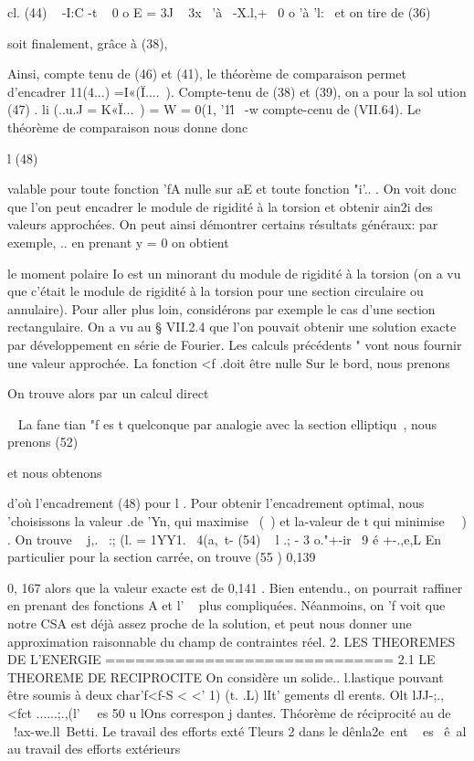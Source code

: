 {{{cl.
(44) ~ 
-I:C -t ~ 0 o
E = 
3J 
~ 3x~ 
'à~ 
-X.l,+~ 0 o 'à 'l:~ 
et on tire de (36) 

soit finalement, grâce à (38), 

Ainsi, compte tenu de (46) et (41), le théorème de comparaison permet d'encadrer 11(4...) =I«(Ï....~). Compte-tenu de (38) et (39), on a pour la sol ution 
(47) . li (..u.J = K«Ï...~) = W = 0(1, '1l\.~ -w 
compte-cenu de (VII.64). Le théorème de comparaison nous donne donc 


l 
(48) 


valable pour toute fonction 'fA nulle sur aE et toute fonction "i'.. . On voit 
donc que l'on peut encadrer le module de rigidité à la torsion et obtenir ain2i des valeurs approchées. 
On peut ainsi démontrer certains résultats généraux: par exemple,
.. 
en prenant y = 0 on obtient 

le moment polaire Io est un minorant du module de rigidité à la torsion (on a vu que c'était le module de rigidité à la torsion pour une section circulaire ou annulaire). 
Pour aller plus loin, considérons par exemple le cas d'une sec­tion rectangulaire. On a vu au § VII.2.4 que l'on pouvait obtenir une so­lution exacte par développement en série de Fourier. Les calculs précédents 
"
vont nous fournir une valeur approchée. La fonction <f .doit être nulle Sur le bord, nous prenons 

On trouve alors par un calcul direct 

~ 
La fane tian "f es t quelconque par analogie avec la section elliptiqu~, nous prenons 
(52) 

et nous obtenons 

d'où l'encadrement (48) pour l . Pour obtenir l'encadrement optimal, nous 'choisissons la valeur .de 'Yn, qui maximise ~(~) et la-valeur de t qui mi­nimise ~~) . On trouve 
~ j,.~
:; (l. 
=
1YY1.~ 
4(a,~t-%
(54) ~ l .;
-
3 o."+-ir~ 9 é +-.,e,L 
En particulier pour la section carrée, on trouve 
(55 ) 0,139 

0, 167 
alors que la valeur exacte est de 0,141 . Bien entendu., on pourrait raffi­ner en prenant des fonctions A et l' ~ plus compliquées. Néanmoins, on
'f 
voit que notre CSA est déjà assez proche de la solution, et peut nous donner une approximation raisonnable du champ de contraintes réel. 
2. LES THEOREMES DE L'ENERGIE 
============================= 
2.1 LE THEOREME DE RECIPROCITE 
On considère un solide.. l.lastique pouvant être soumis à deux char­'f<f-S < <' 1) (t. .L) lIt'
gements dl erents. Olt lJJ-;.,<fct ......;.,(l'~~ es 50 u lOns correspon
j
dantes. 
Théorème de réciprocité au de ~!ax-we.ll~Betti. Le travail des efforts exté­
Tleurs 2 dans le dênla2e~ent ~ es~ ê~al au travail des efforts extérieurs 

}}}
